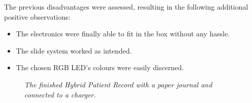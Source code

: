 The previous disadvantages were assessed, resulting in the following additional positive observations:

\begin{itemize} \itemsep0em
  \item The electronics were finally able to fit in the box without any hassle.
  \item The slide system worked as intended.
  \item The chosen RGB LED's colours were easily discerned.
\end{itemize}

\begin{figure}[h]
  \setlength{\belowcaptionskip}{-25mm}
  \centering
  \caption{\small {\it {The finished Hybrid Patient Record with a paper journal and connected to a charger.}}} 
  \label{fig:journal-1}  
\end{figure}

\clearpage